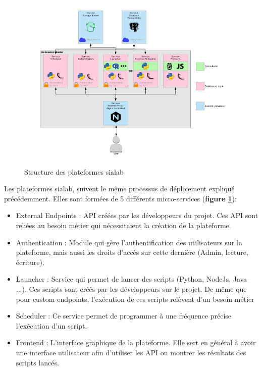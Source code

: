 \documentclass{article} %
\begin{document}
\begin{figure}[!h]
	\centering
	\includegraphics[keepaspectratio = true,scale=0.5]{structure_sia.png}
	\caption{Structure des plateformes sialab}
	\label{fig:strt}
\end{figure}

Les plateformes sialab, suivent le même processus de déploiement expliqué précédemment. Elles sont formées de 5 différents micro-services (\textbf{figure \ref{fig:strt}}):
\begin{itemize}
	\item External Endpoints : API créées par les développeurs du projet. Ces API sont reliées au besoin métier qui nécessitaient la création de la plateforme. 
	\item Authentication : Module qui gère l'authentification des utilisateurs sur la plateforme, mais aussi les droits d'accès sur cette dernière (Admin, lecture, écriture).
	\item Launcher : Service qui permet de lancer des scripts (Python, NodeJs, Java ...). Ces scripts sont créés par les développeurs sur le projet. De même que pour custom endpoints, l'exécution de ces scripts relèvent d'un besoin métier
	\item Scheduler : Ce service permet de programmer à une fréquence précise l'exécution d'un script.
	\item Frontend : L'interface graphique de la plateforme. Elle sert en général à avoir une interface utilisateur afin d'utiliser les API ou montrer les résultats des scripts lancés.
\end{itemize}
\end{document}
